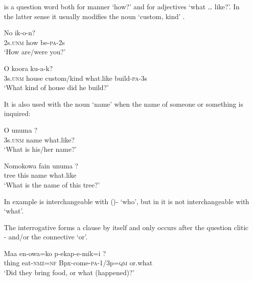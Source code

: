  is a question word both for manner `how?'  and for adjectives `what {\dots} like?'. In the latter sense it usually modifies the noun  `custom, kind' .

\ea%
\label{ex:3:x527}
\gll No  ik-o-n? \\
2s.\textsc{unm} how be-\textsc{pa}-2s\\
\glt`How are/were you?'
\z

\ea%
\label{ex:3:x528}
\gll O koora   ku-a-k? \\
3s.\textsc{unm} house custom/kind what.like build-\textsc{pa}-3s\\
\glt`What kind of house did he build?'
\z

It is also used with the noun  `name' when the name of someone or something is inquired:

\ea%
\label{ex:3:x650}
\gll O unuma ? \\
3s.\textsc{unm} name what.like?\\
\glt`What is his/her name?'
\z

\ea%
\label{ex:3:x651}
\gll Nomokowa fain unuma ? \\
tree this name what.like\\
\glt`What is the name of this tree?'
\z

In example   is interchangeable with ()- `who', but in  it is not interchangeable with  `what'.

The interrogative  forms a clause by itself and only occurs after the question clitic - and/or the connective  `or'. 

\ea%
\label{ex:3:x529}
\gll Maa en-owa=ko p-ekap-e-mik=i ? \\
thing eat-\textsc{nmz}=\textsc{nf} Bpx-come-\textsc{pa}-1/3p=\textsc{qm} or.what\\
\glt`Did they bring food, or what (happened)?'
\z

